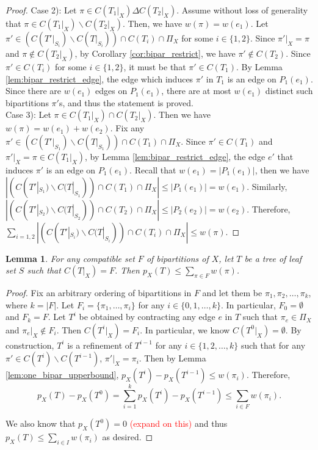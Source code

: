 \documentclass{bmcart}
\newcommand{\note}[1]{\textcolor{red}{#1}}
\newtheorem{lemma}{Lemma}
\begin{document}
\begin{proof}
    Case 2): Let $\pi \in C(T_1|_X) \Delta C(T_2|_X)$. Assume without loss of generality that $\pi \in C(T_1|_X) \backslash C(T_2|_X)$. Then, we have $w(\pi) = w(e_1)$. Let $\pi'\in (C(T'|_{S_i})\backslash C(T|_{S_i})) \cap C(T_i) \cap \Pi_X$ for some $i \in \{1,2\}$. Since $\pi'|_X = \pi$ and $\pi \notin C(T_2|_X)$, by Corollary \ref{cor:bipar_restrict}, we have $\pi' \notin C(T_2)$. Since $\pi' \in C(T_i)$ for some $i\in \{1,2\}$, it must be that $\pi' \in C(T_1)$. By Lemma \ref{lem:bipar_restrict_edge}, the edge which induces $\pi'$ in $T_1$ is an edge on $P_1(e_1)$. Since there are $w(e_1)$ edges on $P_1(e_1)$, there are at most $w(e_1)$ distinct such bipartitions $\pi'$s, and thus the statement is proved.\\
    
    Case 3): Let $\pi \in C(T_1|_X) \cap C(T_2|_X)$. Then we have $w(\pi) = w(e_1)+w(e_2)$. Fix any $\pi'\in (C(T'|_{S_1})\backslash C(T|_{S_1})) \cap C(T_1) \cap \Pi_X$. Since $\pi' \in C(T_1)$ and $\pi'|_X = \pi \in C(T_1|_X)$, by Lemma \ref{lem:bipar_restrict_edge}, the edge $e'$ that induces $\pi'$ is an edge on $P_1(e_1)$. Recall that $w(e_1) = |P_1(e_1)|$, then we have $|(C(T'|_{S_1})\backslash C(T|_{S_1})) \cap C(T_1) \cap \Pi_X| \le |P_1(e_1)| = w(e_1)$. Similarly, $|(C(T'|_{S_2})\backslash C(T|_{S_2})) \cap C(T_2) \cap \Pi_X| \le |P_2(e_2)| = w(e_2)$. Therefore, $\sum_{i = 1,2}|(C(T'|_{S_i})\backslash C(T|_{S_i})) \cap C(T_i) \cap \Pi_X| \le w(\pi)$.
\end{proof}


\begin{lemma} \label{lem:compatible_set_upperbound}
    For any compatible set $F$ of bipartitions of $X$, let $T$ be a tree of leaf set $S$ such that $C(T|_X) = F$. Then $p_X(T) \le \sum_{\pi \in F} w(\pi)$.
\end{lemma}
\begin{proof}
    
    Fix an arbitrary ordering of bipartitions in $F$ and let them be $\pi_1,\pi_2,\dots,\pi_k$, where $k = |F|$. Let $F_i = \{\pi_1,\dots, \pi_i\}$ for any $i \in \{0,1,\dots,k\}$. In particular, $F_0 = \emptyset$ and $F_k = F$. Let $T^i$ be obtained by contracting any edge $e$ in $T$ such that $\pi_e \in \Pi_X$ and $\pi_e|_X \notin F_i$. Then $C(T^i|_X) = F_i$. In particular, we know $C(T^0|_X) = \emptyset$. By construction, $T^i$ is a refinement of $T^{i-1}$ for any $i \in \{1,2,\dots,k\}$ such that for any $\pi' \in C(T^i)\backslash C(T^{i-1})$, $\pi'|_X = \pi_i$. Then by Lemma \ref{lem:one_bipar_upperbound}, $p_X(T^i) - p_X(T^{i-1}) \le w(\pi_i)$. Therefore, 
    \[p_X(T) - p_X(T^0) = \sum_{i = 1}^k p_X(T^i) - p_X(T^{i-1}) \le \sum_{i \in F}w(\pi_i).\]
    
    We also know that $p_X(T^0) = 0$ \note{(expand on this)} and thus $p_X(T) \le \sum_{i \in I}w(\pi_i)$ as desired.
\end{proof}
\end{document}
